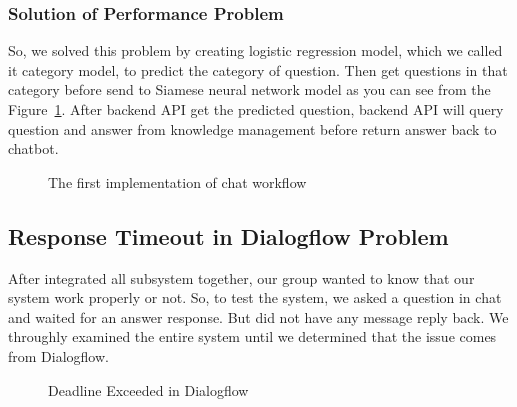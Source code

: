 \documentclass[12pt,oneside,openright,a4paper]{cpe-english-project}
\begin{document}
\subsubsection{Solution of Performance Problem}
So, we solved this problem by creating logistic regression model, which we called it category model,
to predict the category of question. Then get questions in that category before send to Siamese neural
network model as you can see from the Figure~\ref*{fig:model_pattern1}. After backend API get the
predicted question, backend API will query question and answer from knowledge management before
return answer back to chatbot.

\begin{figure}[!h]\centering
{}
\caption{The first implementation of chat workflow}
\label{fig:model_pattern1}
\end{figure}

\subsection{Response Timeout in Dialogflow Problem}
\label{response_timeout_problem_section}
After integrated all subsystem together, our group wanted to know that our system work properly or not.
So, to test the system, we asked a question in chat and waited for an answer response. But did not have
any message reply back. We throughly examined the entire system until we determined that the issue
comes from Dialogflow.

\begin{figure}[!h]\centering
{}
\caption{Deadline Exceeded in Dialogflow}
\label{fig:dialogflow_deadline_exceed}
\end{figure}
\end{document}
